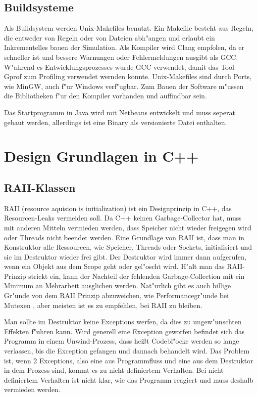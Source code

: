 \documentclass[14pt, a4paper]{report}
\begin{document}
\section{Buildsysteme}
Als Buildsystem werden Unix-Makefiles benutzt. Ein Makefile besteht aus Regeln, die
entweder von Regeln oder von Dateien abh"angen und erlaubt ein Inkrementelles bauen
der Simulation. Als Kompiler wird Clang empfolen, da er schneller ist und bessere
Warnungen oder Fehlermeldungen ausgibt als GCC. W"ahrend es Entwicklungsprozesses 
wurde GCC verwendet, damit das Tool Gprof zum Profiling verwendet wernden konnte.
Unix-Makefiles sind durch Ports, wie MinGW, auch f"ur Windows verf"ugbar. Zum Bauen
der Software m"ussen die Bibliotheken f"ur den Kompiler vorhanden und auffindbar sein.

Das Startprogramm in Java wird mit Netbeans entwickelt und muss seperat gebaut werden,
allerdings ist eine Binary als versionierte Datei enthalten.


\chapter{Design Grundlagen in C++}
\section{RAII-Klassen} \label{RAII}
RAII (resource aquision is initialization) ist ein Designprinzip in C++, das 
Resourcen-Leaks vermeiden soll. Da C++ keinen Garbage-Collector hat, muss mit
anderen Mitteln vermieden werden, 
dass Speicher nicht wieder freigegen wird oder Threads  nicht
beendet werden. Eine Grundlage von RAII ist, dass man in Konstruktor alle Ressourcen, 
wie Speicher, Threads oder Sockets, initialisiert und sie im Destruktor wieder frei gibt.
Der Destruktor wird immer dann aufgerufen, wenn ein Objekt aus dem Scope geht oder
gel"oscht wird. H"alt man das RAII-Prinzip strickt ein, kann der Nachteil der fehlenden
Garbage-Collection mit ein Minimum an Mehrarbeit ausglichen werden. 
Nat"urlich gibt es auch
billige Gr"unde von dem RAII Prinzip abzuweichen, wie Performancegr"unde bei Mutexen
,
aber meisten ist es zu empfehlen, bei RAII zu bleiben.

Man sollte im Destruktor keine Exceptions werfen, da dies zu ungew"unschten Effekten 
f"uhren kann. Wird generell eine Exception geworfen befindet sich das Programm in einem
Unwind-Prozess, dass heißt Codebl"ocke werden so lange verlassen, bis die Exception
gefangen und dannach behandelt wird. Das Problem ist, wenn 2 Exceptions, also eine aus
Programmfluss und eine aus dem Destruktor in dem Prozess sind, kommt es zu nicht
definiertem Verhalten. Bei nicht definiertem Verhalten ist nicht klar, wie das Programm 
reagiert und muss deshalb vermieden werden.
\newpage
\end{document}

